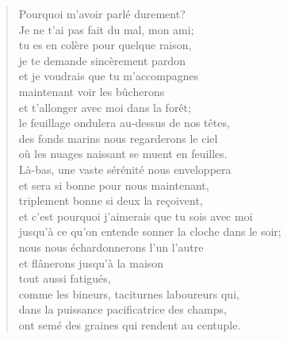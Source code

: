 \documentclass[11pt]{book}
\newcommand*{\centeredornament}{\centerline{\pgfornament[width=6cm]{88}}}
\begin{document}
\newpage

\vspace*{-15mm}
\centeredornament



\begin{verse}
  Pourquoi m'avoir parlé durement? \\
  Je ne t'ai pas fait du mal, mon ami; \\
  tu es en colère pour quelque raison, \\
  je te demande sincèrement pardon \\
  et je voudrais que tu m'accompagnes \\
  maintenant voir les bûcherons \\
  et t'allonger avec moi dans la forêt; \\
  le feuillage ondulera au-dessus de nos têtes, \\
  des fonds marins nous regarderons le ciel \\
  où les nuages naissant se muent en feuilles. \\
  Là-bas, une vaste sérénité nous enveloppera \\
  et sera si bonne pour nous maintenant, \\
  triplement bonne si deux la reçoivent, \\
  et c'est pourquoi j'aimerais que tu sois avec moi \\
  jusqu'à ce qu'on entende sonner la cloche dans le soir; \\
  nous nous échardonnerons l'un l'autre \\
  et flânerons jusqu'à la maison \\
  tout aussi fatigués, \\
  comme les bineurs, taciturnes laboureurs qui,\hspace*{-1mm} \\
  dans la puissance pacificatrice des champs, \\
  ont semé des graines qui rendent au centuple.
\end{verse}

\newpage

\vspace*{-15mm}
\centeredornament


\end{document}
